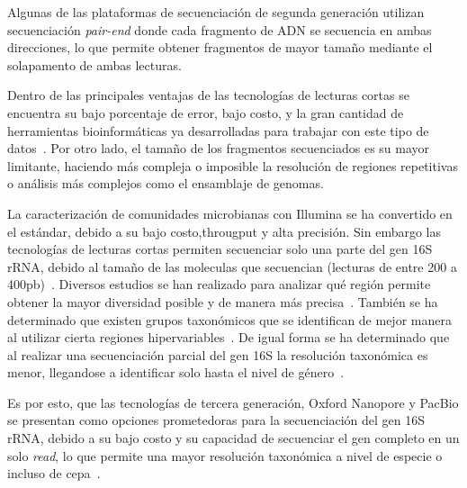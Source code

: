 Algunas de las plataformas de secuenciación de segunda generación utilizan secuenciación \textit{pair-end} donde cada fragmento de ADN se secuencia en ambas direcciones,  lo que permite obtener fragmentos de mayor tamaño mediante el solapamento de ambas lecturas. 

Dentro de las principales ventajas de las tecnologías de lecturas cortas se encuentra su bajo porcentaje de error, bajo costo, y la gran cantidad de herramientas bioinformáticas ya desarrolladas para trabajar con este tipo de datos~\cite{heather2016sequence}. Por otro lado, el tamaño de los fragmentos secuenciados es su mayor limitante, haciendo más compleja o imposible la resolución de regiones repetitivas o análisis más complejos como el ensamblaje de genomas.


La caracterización de comunidades microbianas con Illumina se ha convertido en el estándar, debido a su bajo costo,througput y alta precisión. Sin embargo las tecnologías de lecturas cortas permiten secuenciar solo una parte del gen 16S rRNA, debido al tamaño de las moleculas que secuencian (lecturas de entre 200 a 400pb)~\cite{salipante2014performance}. 
Diversos estudios se han realizado para analizar qué región permite obtener la mayor diversidad posible y de manera más precisa~\cite{liu2008accurate,schloss2011reducing}. También se ha determinado que existen grupos taxonómicos que se identifican de mejor manera al utilizar cierta regiones hipervariables~\cite{he2013comparison,claesson2010comparison}. De igual forma se ha determinado que al realizar una secuenciación parcial del gen 16S la resolución taxonómica es menor, llegandose a identificar solo hasta el nivel de género~\cite{liu2008accurate}.
 
Es por esto, que las tecnologías de tercera generación, Oxford Nanopore y PacBio se presentan como opciones prometedoras para la secuenciación del gen 16S rRNA, debido a su bajo costo y su capacidad de secuenciar el gen completo en un solo \textit{read}, lo que permite una mayor resolución taxonómica a nivel de especie o incluso de cepa~\cite{szoboszlay2023nanopore}.%




